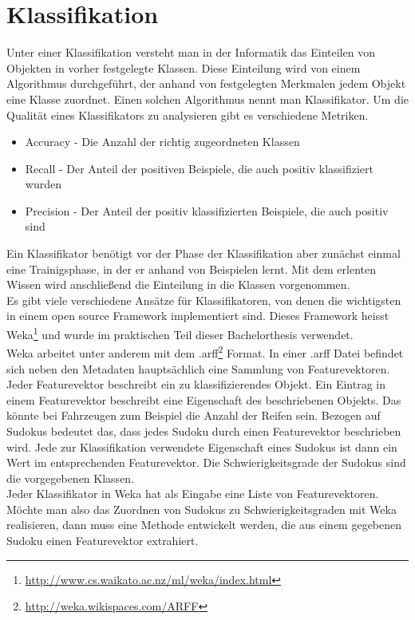 \chapter{Klassifikation}
Unter einer Klassifikation versteht man in der Informatik das Einteilen von Objekten in vorher festgelegte Klassen. Diese Einteilung wird von einem Algorithmus durchgeführt, der anhand von festgelegten Merkmalen jedem Objekt eine Klasse zuordnet. Einen solchen Algorithmus nennt man Klassifikator. Um die Qualität eines Klassifikators zu analysieren gibt es verschiedene Metriken.
\begin{itemize}
\item Accuracy - Die Anzahl der richtig zugeordneten Klassen
\item Recall - Der Anteil der positiven Beispiele, die auch positiv klassifiziert wurden
\item Precision - Der Anteil der positiv klassifizierten Beispiele, die auch positiv sind
\end{itemize}
Ein Klassifikator benötigt vor der Phase der Klassifikation aber zunächst einmal eine Trainigsphase, in der er anhand von Beispielen lernt. Mit dem erlenten Wissen wird anschließend die Einteilung in die Klassen vorgenommen.\\
Es gibt viele verschiedene Ansätze für Klassifikatoren, von denen die wichtigsten in einem open source Framework implementiert sind. Dieses Framework heisst Weka\footnote{\url{http://www.cs.waikato.ac.nz/ml/weka/index.html}} und wurde im praktischen Teil dieser Bachelorthesis verwendet.\\
Weka arbeitet unter anderem mit dem .arff\footnote{\url{http://weka.wikispaces.com/ARFF}} Format. In einer .arff Datei befindet sich neben den Metadaten hauptsächlich eine Sammlung von Featurevektoren. Jeder Featurevektor beschreibt ein zu klassifizierendes Objekt. Ein Eintrag in einem Featurevektor beschreibt eine Eigenschaft des beschriebenen Objekts. Das könnte bei Fahrzeugen zum Beispiel die Anzahl der Reifen sein. Bezogen auf Sudokus bedeutet das, dass jedes Sudoku durch einen Featurevektor beschrieben wird. Jede zur Klassifikation verwendete Eigenschaft eines Sudokus ist dann ein Wert im entsprechenden Featurevektor. Die Schwierigkeitsgrade der Sudokus sind die vorgegebenen Klassen.\\
Jeder Klassifikator in Weka hat als Eingabe eine Liste von Featurevektoren. Möchte man also das Zuordnen von Sudokus zu Schwierigkeitsgraden mit Weka realisieren, dann muss eine Methode entwickelt werden, die aus einem gegebenen Sudoku einen Featurevektor extrahiert.\\
